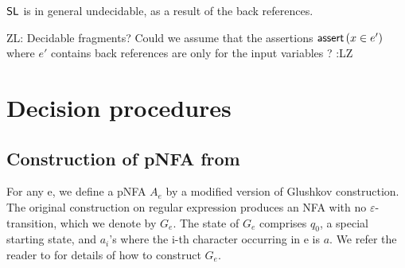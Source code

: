 \documentclass[sigplan,review,anonymous]{acmart}\settopmatter{printfolios=true,printccs=false,printacmref=false}
\newcommand{\zhilin}[1]{\color{brown} {ZL: #1 :LZ} \color{black}}
\newcommand{\zhilin}[1]{}
\begin{document}
$\mathsf{SL}$ is in general undecidable, as a result of the back references.

\zhilin{Decidable fragments? Could we assume that the assertions $\textsf{assert}\left(x \in e'\right)$ where $e'$ contains back references are only for the input variables ?}


\section{Decision procedures}

\subsection{Construction of pNFA from \regexp[\sf CG]}
\label{pNFA_cons}

For any \regexp[\sf CG] e, we define a pNFA $A_e$ by a modified version of
Glushkov construction\cite{Gluskov61}. The original construction on regular expression
produces an NFA with no $\varepsilon$-transition, which we denote by $G_e$.
The state of $G_e$ comprises $q_0$, a special starting state, and $a_i$'s
where the i-th character occurring in e is $a$. We refer the reader to \cite{Gluskov61} for 
details of how to construct $G_e$.
\end{document}
